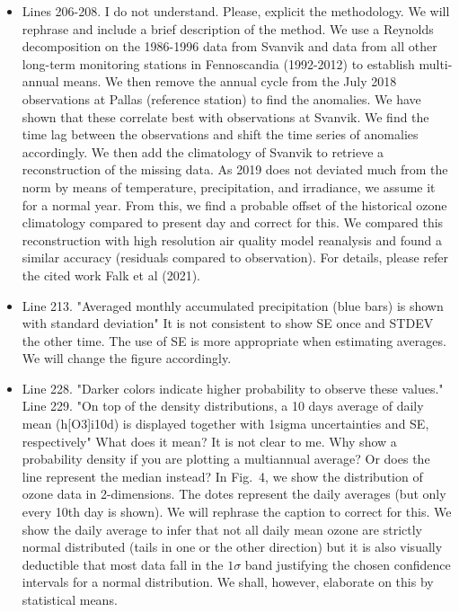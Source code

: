 \documentclass{scrartcl}
\begin{document}
\begin{itemize}
\item {\color{blue}Lines 206-208. I do not understand. Please, explicit the methodology.}
We will rephrase and include a brief description of the method. We use a Reynolds decomposition on the 1986-1996 data from Svanvik and data from all other long-term monitoring stations in Fennoscandia (1992-2012) to establish multi-annual means. We then remove the annual cycle from the July 2018 observations at Pallas (reference station) to find the anomalies. We have shown that these correlate best with observations at Svanvik. We find the time lag between the observations and shift the time series of anomalies accordingly. We then add the climatology of Svanvik to retrieve a reconstruction of the missing data. As 2019 does not deviated much from the norm by means of temperature, precipitation, and irradiance, we assume it for a normal year. From this, we find a probable offset of the historical ozone climatology compared to present day and correct for this. We compared this reconstruction with high resolution air quality model reanalysis and found a similar accuracy (residuals compared to observation). For details, please refer the cited work Falk et al (2021).

\item {\color{blue}Line 213. "Averaged monthly accumulated precipitation (blue bars) is shown with standard deviation" It is not consistent to show SE once and STDEV the other time. The use of SE is more appropriate when estimating averages.}
We will change the figure accordingly.

\item {\color{blue}Line 228. "Darker colors indicate higher probability to observe these values."\\Line 229. "On top of the density distributions, a 10 days average of daily mean (h[O3]i10d) is displayed together with 1sigma uncertainties and SE, respectively" What does it mean? It is not clear to me. Why show a probability density if you are plotting a multiannual average? Or does the line represent the median instead?} In Fig.~4, we show the distribution of ozone data in 2-dimensions. The dotes represent the daily averages (but only every 10th day is shown). We will rephrase the caption to correct for this. We show the daily average to infer that not all daily mean ozone are strictly normal distributed (tails in one or the other direction) but it is also visually deductible that most data fall in the $1\sigma$ band justifying the chosen confidence intervals for a normal distribution. We shall, however, elaborate on this by statistical means.


\end{itemize}
\end{document}

